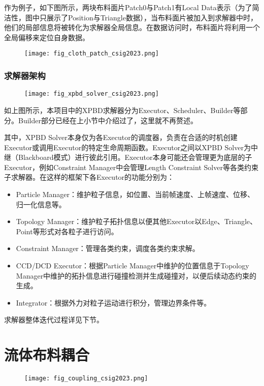 作为例子，如下图所示，两块布料面片Patch0与Patch1有Local Data表示（为了简洁性，图中只展示了Position与Triangle数据），当布料面片被加入到求解器中时，他们的局部信息将被转化为求解器全局信息。在数据访问时，布料面片将利用一个全局偏移来定位自身数据。
\begin{figure}[H]
	\centering
	\texttt{[image: fig\_cloth\_patch\_csig2023.png]}
\end{figure}

\subsubsection{求解器架构}

\begin{figure}[H]
	\centering
	\texttt{[image: fig\_xpbd\_solver\_csig2023.png]}
\end{figure}

如上图所示，本项目中的XPBD求解器分为Executor、Scheduler、Builder等部分。Builder部分已经在上小节中介绍过了，这里就不再赘述。

其中，XPBD Solver本身仅为各Executor的调度器，负责在合适的时机创建Executor或调用Executor的特定生命周期函数。Executor之间以XPBD Solver为中继（Blackboard模式）进行彼此引用。Executor本身可能还会管理更为底层的子Executor，例如Constraint Manager中会管理Length Constraint Solver等各类约束子求解器。在这样的框架下各Executor的功能分别为：
\begin{itemize}
	\item Particle Manager：维护粒子信息，如位置、当前帧速度、上帧速度、位移、归一化信息等。
	\item Topology Manager：维护粒子拓扑信息以便其他Executor以Edge、Triangle、Point等形式对各粒子进行访问。
	\item Constraint Manager：管理各类约束，调度各类约束求解。
	\item CCD/DCD Executor：根据Particle Manager中维护的位置信息于Topology Manager中维护的拓扑信息进行碰撞检测并生成碰撞对，以便后续动态约束的生成。
	\item Integrator：根据外力对粒子运动进行积分，管理边界条件等。
\end{itemize}
求解器整体迭代过程详见下节。

\section{流体布料耦合}

\begin{figure}[H]
	\centering
	\texttt{[image: fig\_coupling\_csig2023.png]}
\end{figure}

